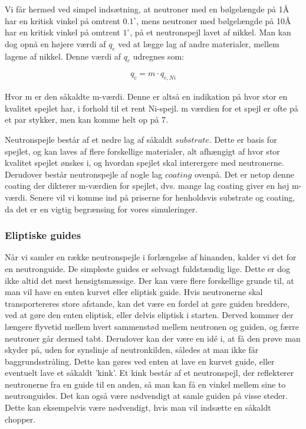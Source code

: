 \documentclass[12pt,oneside,a4paper]{article}
\begin{document}
{{{{{Vi får hermed ved simpel indsætning, at neutroner med en bølgelængde på 1Å har en kritisk vinkel på omtrent $0.1^∘$, mens neutroner med bølgelængde på 10Å har en kritisk vinkel på omtrent $1^∘$, på et neutronspejl lavet af nikkel.
Man kan dog opnå en højere værdi af $q_c$ ved at lægge lag af andre materialer, mellem lagene af nikkel. Denne værdi af $q_c$ udregnes som:

\begin{align}
q_c=m \cdot q_{c,Ni}
\end{align}

Hvor m er den såkaldte m-værdi. Denne er altså en indikation på hvor stor en kvalitet spejlet har, i forhold til et rent Ni-spejl. m værdien for et spejl er ofte på et par stykker, men kan komme helt op på 7. \cite{lefmann_arleth_kirkensgaard_lebech_thomsen}

Neutronspejle består af et nedre lag af såkaldt $substrate$. Dette er basis for spejlet, og kan laves af flere forskellige materialer, alt afhængigt af hvor stor kvalitet spejlet ønskes i, og hvordan spejlet skal interergere med neutronerne. Derudover består neutronspejle af nogle lag $coating$ ovenpå. Det er netop denne coating der dikterer m-værdien for spejlet, dvs. mange lag coating giver en høj m-værdi. Senere vil vi komme ind på priserne for henholdsvis substrate og coating, da det er en vigtig begrænsing for vores simuleringer.

\subsubsection{Eliptiske guides}
Når vi samler en række neutronspejle i forlængelse af hinanden, kalder vi det for en neutronguide. De simpleste guides er selvsagt fuldstændig lige. Dette er dog ikke altid det mest hensigtsmæssige. Der kan være flere forskellige grunde til, at man vil have en enten kurvet eller eliptisk guide. Hvis neutronerne skal transportereres store afstande, kan det være en fordel at gøre guiden breddere, ved at gøre den enten eliptisk, eller delvis eliptisk i starten. Derved kommer der længere flyvetid mellem hvert sammenstød mellem neutronen og guiden, og færre neutroner går dermed tabt. Derudover kan der være en idé i, at få den prøve man skyder på, uden for synslinje af neutronkilden, således at man ikke får baggrundsstråling. Dette kan gøres ved enten at lave en kurvet guide, eller eventuelt lave et såkaldt 'kink'. Et kink består af et neutronspejl, der reflekterer neutronerne fra en guide til en anden, så man kan få en vinkel mellem sine to neutronguides. 
Det kan også være nødvendigt at samle guiden på visse steder. Dette kan eksempelvis være nødvendigt, hvis man vil indsætte en såkaldt chopper.

}}}}}
\end{document}
